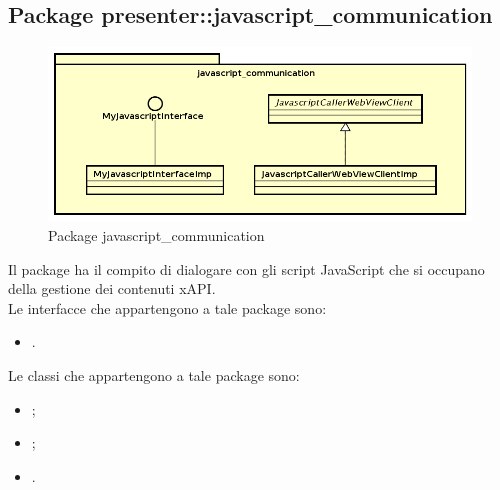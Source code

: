 \documentclass[../Tesi.tex]{subfiles}
\begin{document}
	\subsection{Package presenter::javascript\_communication}
		\begin{figure}[H]
			\centering
			\includegraphics[scale=0.6]{images/package_diagrams/javascript_communication}
				\caption{Package javascript\_communication}
			\label{fig:StrutturaMVP}
		\end{figure}
		Il package  ha il compito di dialogare con gli script JavaScript che si occupano della gestione dei contenuti xAPI. \\
		Le interfacce che appartengono a tale package sono:
		\begin{itemize}
			\item {}.
		\end{itemize}
		Le classi che appartengono a tale package sono:
		\begin{itemize}
			\item {};
			\item {};
			\item {}.
		\end{itemize}
\end{document}
